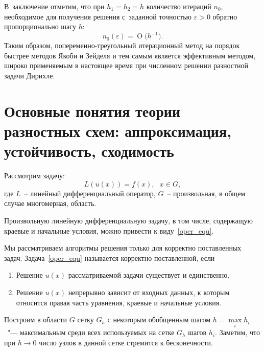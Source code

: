 \documentclass[11pt,a4paper,twoside,listtotoc,bibtotoc]{report}
\numberwithin{equation}{section}
\theoremstyle{definition}
\theoremstyle{plain}
\newcommand{\bigO}[1]{\ensuremath{\operatorname{O}\bigl(#1\bigr)}}
\begin{document}
В~заключение отметим, что
при $h_1=h_2=h$ количество итераций $n_0$, необходимое
для получения решения с~заданной точностью $\varepsilon>0$ обратно пропорционально
шагу $h$:
%
$$
    n_0(\varepsilon)=\bigO{h^{-1}}.
$$
%
Таким образом, попеременно-треугольный итерационный метод на порядок быстрее
методов Якоби и Зейделя и тем самым является эффективным методом, широко
применяемым в настоящее время при численном решении разностной задачи Дирихле.
%
\section[Основные понятия теории разностных схем]
{Основные понятия теории разностных схем: аппроксимация, устойчивость, сходимость}
%
Рассмотрим задачу:
%
\begin{equation}
%
    \label{oper_equ}
    L(u(x)) = f(x),~~~x \in G,
%
\end{equation}
%
где $L$~-- линейный дифференциальный оператор, $G$~-- произвольная, в общем
случае многомерная, область.

Произвольную линейную дифференциальную задачу, в том числе, содержащую краевые
и начальные условия, можно привести к виду~\eqref{oper_equ}.

Мы рассматриваем алгоритмы решения только для корректно поставленных задач.
Задача~\eqref{oper_equ} называется корректно поставленной, если
%
\begin{enumerate}
%
    \item
    Решение $u(x)$ рассматриваемой задачи существует и единственно.
    \item
    Решение $u(x)$ непрерывно зависит от входных данных, к которым относится
    правая часть уравнения, краевые и начальные условия.
%
\end{enumerate}
%

Построим в области $G$ сетку $G_h$ с некоторым
обобщенным шагом $h = \max\limits_i{h_i}$~"--- максимальным среди всех
используемых на сетке $G_h$ шагов $h_i$. Заметим, что при $h \rightarrow 0$
число узлов в данной сетке стремится к бесконечности.
\end{document}
